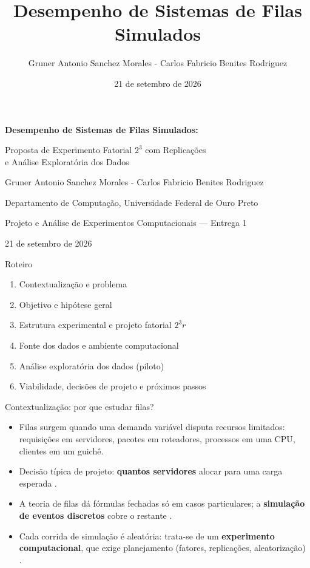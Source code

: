\documentclass[aspectratio=169,11pt]{beamer}
\title{Desempenho de Sistemas de Filas Simulados}
\author{Gruner Antonio Sanchez Morales - Carlos Fabricio Benites Rodriguez}
\date{21 de setembro de 2026}
\newcommand{\destaque}[1]{{\color{azul}\bfseries #1}}
\begin{document}
\begin{frame}[plain]
  \vspace*{1.3cm}
  {\color{azul}\LARGE\bfseries Desempenho de Sistemas de Filas Simulados:\par}
  \vspace{2pt}
  {\color{azul}\Large Proposta de Experimento Fatorial $2^3$ com Replicações\\e Análise Exploratória dos Dados\par}
  \vspace{0.9cm}
  {\large Gruner Antonio Sanchez Morales - Carlos Fabricio Benites Rodriguez\par}
  \vspace{4pt}
  Departamento de Computação, Universidade Federal de Ouro Preto\par
  Projeto e Análise de Experimentos Computacionais --- Entrega 1\par
  21 de setembro de 2026
\end{frame}

\begin{frame}{Roteiro}
  \begin{enumerate}
    \setlength{\itemsep}{5pt}
    \item Contextualização e problema
    \item Objetivo e hipótese geral
    \item Estrutura experimental e projeto fatorial $2^3 r$
    \item Fonte dos dados e ambiente computacional
    \item Análise exploratória dos dados (piloto)
    \item Viabilidade, decisões de projeto e próximos passos
  \end{enumerate}
\end{frame}

\begin{frame}{Contextualização: por que estudar filas?}
  \begin{itemize}
    \setlength{\itemsep}{6pt}
    \item Filas surgem quando uma demanda variável disputa recursos limitados: requisições em servidores, pacotes em roteadores, processos em uma CPU, clientes em um guichê.
    \item Decisão típica de projeto: \destaque{quantos servidores} alocar para uma carga esperada \parencite{jain1991}.
    \item A teoria de filas dá fórmulas fechadas só em casos particulares; a \destaque{simulação de eventos discretos} cobre o restante \parencite{law2000}.
    \item Cada corrida de simulação é aleatória: trata-se de um \destaque{experimento computacional}, que exige planejamento (fatores, replicações, aleatorização) \parencite{jain1991,montgomery2017}.
  \end{itemize}
\end{frame}
\end{document}
